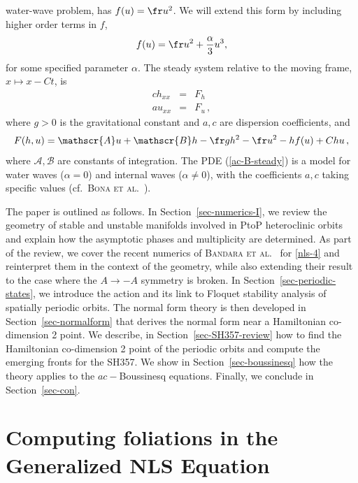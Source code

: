 \documentclass[10pt]{article}
\def\iA{\mathscr{A}}
\def\iB{\mathscr{B}}
\begin{document}
water-wave problem, has $f(u)=\fr u^2$. We will extend this form by including
higher order terms in $f$,
%
\begin{equation}\label{f-def-bouss}
f(u) = \fr u^2 + \frac{\alpha}{3} u^3, 
\end{equation}
%
for some specified parameter $\alpha$. The steady system relative to the moving frame, $x\mapsto x-Ct$, is
%
\begin{equation}\label{ac-B-steady}
\begin{array}{rcl}
c h_{xx} &=& F_h\\[2mm]
a u_{xx} &=& F_u\,,
\end{array}
\end{equation}
%
where $g>0$ is the gravitational constant and $a,c$ are dispersion
coefficients, and
%
\begin{equation}\label{ac-F-def}
F(h,u) = \iA u + \iB h - \fr gh^2 -\fr u^2 - hf(u) + C hu\,,
\end{equation}
%
where $\iA,\iB$ are constants of integration. The PDE (\ref{ac-B-steady}) is a model
for water waves ($\alpha=0$) and internal waves ($\alpha\neq0$), with the
coefficients $a,c$ taking specific values (cf.\ \textsc{Bona et
al.}~\cite{bcs-II}). 

The paper is outlined as follows. In Section~\ref{sec-numerics-I}, we review the geometry of stable and unstable manifolds involved in PtoP heteroclinic orbits and explain how the asymptotic phases and multiplicity are determined. As part of the review, we cover the recent numerics of \textsc{Bandara et al.}~\cite{bgbk21,bgbk23,bgbk25} for \eqref{nls-4} and reinterpret them in the context of the geometry, while also extending their result to the case where the $A\rightarrow-A$ symmetry is broken. In Section~\ref{sec-periodic-states}, we introduce the action and its link to Floquet stability analysis of spatially periodic orbits. The normal form theory is then developed in Section~\ref{sec-normalform} that derives the normal form near a Hamiltonian co-dimension 2 point. We describe, in Section~\ref{sec-SH357-review} how to find the Hamiltonian co-dimension 2 point of the periodic orbits and compute the emerging fronts for the SH357. We show in Section~\ref{sec-boussinesq} how the theory applies to the $ac-$Boussinesq equations. Finally, we conclude in Section~\ref{sec-con}. 

\section{Computing foliations in the Generalized NLS Equation}
\setcounter{equation}{0}
\label{sec-numerics-I}
\end{document}
